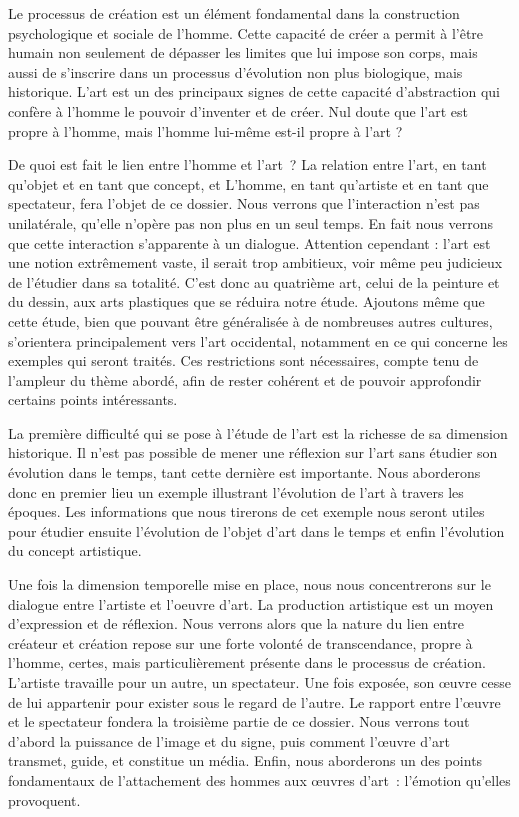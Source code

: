 	 Le processus de création est un élément fondamental dans la construction psychologique et sociale de l'homme. Cette capacité de créer a permit à l'être humain non seulement de dépasser les limites que lui impose son corps, mais aussi de s'inscrire dans un processus d'évolution non plus biologique, mais historique. L'art est un des principaux signes de cette capacité d'abstraction qui confère à l'homme le pouvoir d'inventer et de créer. Nul doute que l'art est propre à l'homme, mais l'homme lui-même est-il propre à l'art ?

De quoi est fait le lien entre l'homme et l'art ? La relation entre l'art, en tant qu'objet et en tant que concept, et L'homme, en tant qu'artiste et en tant que spectateur, fera l'objet de ce dossier. Nous verrons que l'interaction n'est pas unilatérale, qu'elle n’opère pas non plus en un seul temps. En fait nous verrons que cette interaction s'apparente à un dialogue. Attention cependant : l'art est une notion extrêmement vaste, il serait trop ambitieux, voir même peu judicieux de l'étudier dans sa totalité. C'est donc au quatrième art, celui de la peinture et du dessin, aux arts plastiques que se réduira notre étude. Ajoutons même que cette étude, bien que pouvant être généralisée à de nombreuses autres cultures, s'orientera principalement vers l'art occidental, notamment en ce qui concerne les exemples qui seront traités. Ces restrictions sont nécessaires, compte tenu de l'ampleur du thème abordé, afin de rester cohérent et de pouvoir approfondir certains points intéressants.

\xspace
	La première difficulté qui se pose à l'étude de l'art est la richesse de sa dimension historique. Il n'est pas possible de mener une réflexion sur l'art sans étudier son évolution dans le temps, tant cette dernière est importante. Nous aborderons donc en premier lieu un exemple illustrant l'évolution de l'art à travers les époques. Les informations que nous tirerons de cet exemple nous seront utiles pour étudier ensuite l'évolution de l'objet d'art dans le temps et enfin l'évolution du concept artistique.

	Une fois la dimension temporelle mise en place, nous nous concentrerons sur le dialogue entre l'artiste et l'oeuvre d'art. La production artistique est un moyen d'expression et de réflexion. Nous verrons alors que la nature du lien entre créateur et création repose sur une forte volonté de transcendance, propre à l'homme, certes, mais particulièrement présente dans le processus de création.
L’artiste travaille pour un autre, un spectateur. Une fois exposée, son œuvre cesse de lui appartenir pour exister sous le regard de l’autre. Le rapport entre l’œuvre et le spectateur fondera la troisième partie de ce dossier. Nous verrons tout d’abord la puissance de l’image et du signe, puis comment l’œuvre d’art transmet, guide, et constitue un média. Enfin, nous aborderons un des points fondamentaux de l’attachement des hommes aux œuvres d’art : l’émotion qu’elles provoquent.   
	
